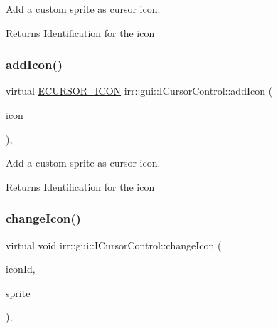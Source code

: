 Add a custom sprite as cursor icon. 

\begin{DoxyReturn}{Returns}
Identification for the icon 
\end{DoxyReturn}
\mbox{\label{classirr_1_1gui_1_1ICursorControl_a102ff455c70595886281e636ef063d3b}} 
\subsubsection{\texorpdfstring{add\+Icon()}{addIcon()}\hspace{0.1cm}{\footnotesize\ttfamily [2/2]}}
{\footnotesize\ttfamily virtual \hyperlink{namespaceirr_1_1gui_aefee802dd632c5735703e40ef40f879b}{E\+C\+U\+R\+S\+O\+R\+\_\+\+I\+C\+ON} irr\+::gui\+::\+I\+Cursor\+Control\+::add\+Icon (\begin{DoxyParamCaption}\item[{const \hyperlink{structirr_1_1gui_1_1SCursorSprite}{gui\+::\+S\+Cursor\+Sprite} \&}]{icon }\end{DoxyParamCaption})\hspace{0.3cm}{\ttfamily [inline]}, {\ttfamily [virtual]}}



Add a custom sprite as cursor icon. 

\begin{DoxyReturn}{Returns}
Identification for the icon 
\end{DoxyReturn}
\mbox{\label{classirr_1_1gui_1_1ICursorControl_a3e7c8cb1f03e1ccc31fcc3c30f717762}} 
\subsubsection{\texorpdfstring{change\+Icon()}{changeIcon()}\hspace{0.1cm}{\footnotesize\ttfamily [1/2]}}
{\footnotesize\ttfamily virtual void irr\+::gui\+::\+I\+Cursor\+Control\+::change\+Icon (\begin{DoxyParamCaption}\item[{\hyperlink{namespaceirr_1_1gui_aefee802dd632c5735703e40ef40f879b}{E\+C\+U\+R\+S\+O\+R\+\_\+\+I\+C\+ON}}]{icon\+Id,  }\item[{const \hyperlink{structirr_1_1gui_1_1SCursorSprite}{gui\+::\+S\+Cursor\+Sprite} \&}]{sprite }\end{DoxyParamCaption})\hspace{0.3cm}{\ttfamily [inline]}, {\ttfamily [virtual]}}



